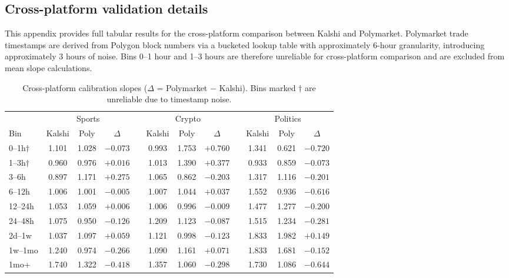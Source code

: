 \documentclass[numsec,webpdf,modern,medium]{oup-authoring-template}
\theoremstyle{thmstyleone}%
\theoremstyle{thmstyletwo}%
\theoremstyle{thmstylethree}%
\begin{document}
\begin{appendices}
\section{Cross-platform validation details}\label{app:crossplatform}

This appendix provides full tabular results for the cross-platform comparison between Kalshi and Polymarket. Polymarket trade timestamps are derived from Polygon block numbers via a bucketed lookup table with approximately 6-hour granularity, introducing approximately 3 hours of noise. Bins 0--1 hour and 1--3 hours are therefore unreliable for cross-platform comparison and are excluded from mean slope calculations.

\begin{table}[!t]
\caption{Cross-platform calibration slopes ($\Delta$ = Polymarket $-$ Kalshi). Bins marked $\dagger$ are unreliable due to timestamp noise.\label{tab:cross_slopes}}
\tabcolsep=0pt%
\begin{tabular*}{\textwidth}{@{\extracolsep{\fill}}lccclccclccc@{\extracolsep{\fill}}}
\toprule
& \multicolumn{3}{c}{Sports} && \multicolumn{3}{c}{Crypto} && \multicolumn{3}{c}{Politics} \\
\cline{2-4}\cline{6-8}\cline{10-12}
Bin & Kalshi & Poly & $\Delta$ && Kalshi & Poly & $\Delta$ && Kalshi & Poly & $\Delta$ \\
\midrule
0--1h$\dagger$  & 1.101 & 1.028 & $-0.073$ && 0.993 & 1.753 & $+0.760$ && 1.341 & 0.621 & $-0.720$ \\
1--3h$\dagger$  & 0.960 & 0.976 & $+0.016$ && 1.013 & 1.390 & $+0.377$ && 0.933 & 0.859 & $-0.073$ \\
3--6h           & 0.897 & 1.171 & $+0.275$ && 1.065 & 0.862 & $-0.203$ && 1.317 & 1.116 & $-0.201$ \\
6--12h          & 1.006 & 1.001 & $-0.005$ && 1.007 & 1.044 & $+0.037$ && 1.552 & 0.936 & $-0.616$ \\
12--24h         & 1.053 & 1.059 & $+0.006$ && 1.006 & 0.996 & $-0.009$ && 1.477 & 1.277 & $-0.200$ \\
24--48h         & 1.075 & 0.950 & $-0.126$ && 1.209 & 1.123 & $-0.087$ && 1.515 & 1.234 & $-0.281$ \\
2d--1w          & 1.037 & 1.097 & $+0.059$ && 1.121 & 0.998 & $-0.123$ && 1.833 & 1.982 & $+0.149$ \\
1w--1mo         & 1.240 & 0.974 & $-0.266$ && 1.090 & 1.161 & $+0.071$ && 1.833 & 1.681 & $-0.152$ \\
1mo+            & 1.740 & 1.322 & $-0.418$ && 1.357 & 1.060 & $-0.298$ && 1.730 & 1.086 & $-0.644$ \\

\end{tabular*}
\end{table}
\end{appendices}
\end{document}
